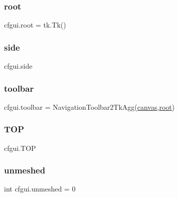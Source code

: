 \subsubsection{\texorpdfstring{root}{root}}
{\footnotesize\ttfamily cfgui.\+root = tk.\+Tk()}

\mbox{\label{namespacecfgui_ae9b6ae360c249a392d4154426dff9609}} 
\subsubsection{\texorpdfstring{side}{side}}
{\footnotesize\ttfamily cfgui.\+side}

\mbox{\label{namespacecfgui_a7410773bac81022643bbb700b65ffd35}} 
\subsubsection{\texorpdfstring{toolbar}{toolbar}}
{\footnotesize\ttfamily cfgui.\+toolbar = Navigation\+Toolbar2\+Tk\+Agg(\mbox{\hyperlink{namespacecfgui_aafee5f0725f5961d2bc6696ddac838ce}{canvas}},\mbox{\hyperlink{namespacecfgui_ad0261b0d3cca8159d011afa3c17bd9f1}{root}})}

\mbox{\label{namespacecfgui_abdd84db69f76172a7b2e574cf726eb24}} 
\subsubsection{\texorpdfstring{T\+OP}{TOP}}
{\footnotesize\ttfamily cfgui.\+T\+OP}

\mbox{\label{namespacecfgui_ade4f0d3b0706b49e072673e48b2ac242}} 
\subsubsection{\texorpdfstring{unmeshed}{unmeshed}}
{\footnotesize\ttfamily int cfgui.\+unmeshed = 0}

